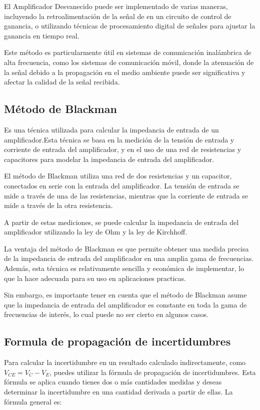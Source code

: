 El Amplificador Desvanecido puede ser implementado de varias maneras, incluyendo la retroalimentación de la señal de en un circuito de control de ganancia, o utilizando
técnicas de procesamiento digital de señales para ajustar la ganancia en tiempo real.

Este método es particularmente útil en sistemas de comunicación inalámbrica de alta frecuencia, como los sistemas de comunicación móvil, donde la atenuación de la señal debido a la propagación en el medio ambiente puede ser significativa y afectar la calidad de la señal
recibida.

\subsection{Método de Blackman}

Es una técnica utilizada para calcular la impedancia de entrada de un amplificador.Esta técnica se basa en la medición de la tensión de entrada y corriente de entrada del
amplificador, y en el uso de una red de resistencias y capacitores para modelar la impedancia
de entrada del amplificador.

El método de Blackman utiliza una red de dos resistencias y un capacitor, conectados en serie con la entrada del amplificador. La tensión de entrada se mide a través de una de las resistencias, mientras que la corriente de entrada se mide a través de la otra resistencia.

A partir de estas mediciones, se puede calcular la impedancia de entrada del amplificador utilizando la ley de Ohm y la ley de Kirchhoff.

La ventaja del método de Blackman es que permite obtener una medida precisa de la impedancia de entrada del amplificador en una amplia gama de frecuencias. Además, esta
técnica es relativamente sencilla y económica de implementar, lo que la hace adecuada para su uso en aplicaciones practicas.

Sin embargo, es importante tener en cuenta que el método de Blackman asume que la impedancia de entrada del amplificador es constante en toda la gama de frecuencias de
interés, lo cual puede no ser cierto en algunos casos.

\subsection{Formula de propagación de incertidumbres}

Para calcular la incertidumbre en un resultado calculado indirectamente, como \( V_{CE} = V_C - V_E \), puedes utilizar la fórmula de propagación de incertidumbres. Esta fórmula se aplica cuando tienes dos o más cantidades medidas y deseas determinar la incertidumbre en una cantidad derivada a partir de ellas. La fórmula general es:

